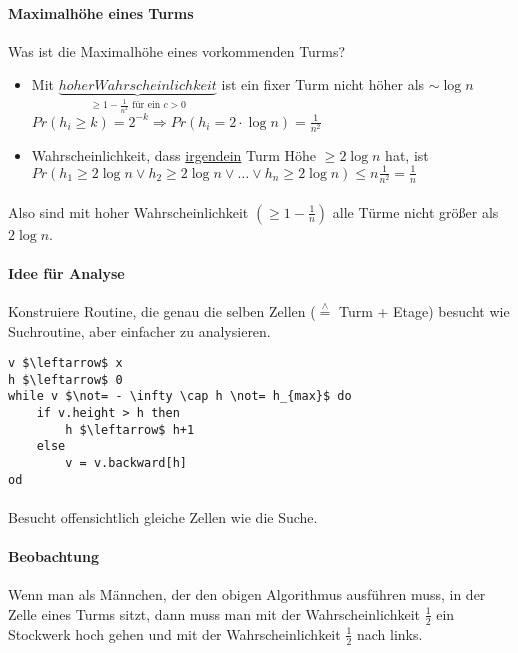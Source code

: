 \paragraph*{Maximalhöhe eines Turms} Was ist die Maximalhöhe eines vorkommenden Turms?
\begin{itemize}
	\item Mit $\underbrace{hoher Wahrscheinlichkeit}_{\geq 1 - \frac{1}{n^2} \text{ für ein } c>0}$
	ist ein fixer Turm nicht höher als $\sim \log n$
	$Pr(h_i \geq k) = 2^{-k} \Rightarrow Pr(h_i = 2 \cdot \log n) = \frac{1}{n^2}$
	\item Wahrscheinlichkeit, dass \underline{irgendein} Turm Höhe $\geq 2 \log n$ hat, ist $Pr(h_1 \geq 2 \log n \lor h_2 \geq 2 \log n \lor \dots \lor h_n \geq 2 \log n) \leq n \frac{1}{n^2} = \frac{1}{n}$
\end{itemize}


\paragraph*{} Also sind mit hoher Wahrscheinlichkeit $(\geq 1 - \frac{1}{n})$ alle Türme nicht größer als $2 \log n$.

\paragraph*{Idee für Analyse} Konstruiere Routine, die genau die selben Zellen ($\overset{\wedge}{=}$ Turm + Etage) besucht wie Suchroutine, aber einfacher zu analysieren.


\begin{lstlisting}[mathescape]
v $\leftarrow$ x
h $\leftarrow$ 0
while v $\not= - \infty \cap h \not= h_{max}$ do
	if v.height > h then
		h $\leftarrow$ h+1
	else
		v = v.backward[h]
od
\end{lstlisting}
\marginpar{\textcolor{blue}{\scriptsize $v.back-ward[h]$ Verweis auf Turm, der auf $v$ in Höhe $h$ zeigt}}

\paragraph*{} Besucht offensichtlich gleiche Zellen wie die Suche.

\paragraph*{Beobachtung} Wenn man als Männchen, der den obigen Algorithmus ausführen muss, in der Zelle eines Turms sitzt, dann muss man mit der Wahrscheinlichkeit $\frac{1}{2}$ ein Stockwerk hoch gehen und mit der Wahrscheinlichkeit $\frac{1}{2}$ nach links.
